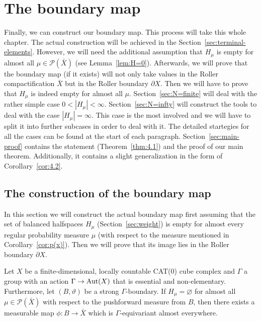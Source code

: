 \section{The boundary map}
\label{sec:map}

Finally, we can construct our boundary map. This process will take this whole chapter. The actual construction will be achieved in the Section~\ref{sec:terminal-elements}. However, we will need the additional assumption that \(H_\mu\) is empty for almost all \(\mu \in \mathcal{P}(\bar X)\) (see Lemma~\ref{lem:H=0}). Afterwards, we will prove that the boundary map (if it exists) will not only take values in the Roller compactification \(\bar X\) but in the Roller boundary \(\partial X\). Then we will have to prove that \(H_\mu\) is indeed empty for almost all \(\mu\). Section~\ref{sec:N=finite} will deal with the rather simple case \(0 < |H_\mu| < \infty\). Section~\ref{sec:N=infty} will construct the tools to deal with the case \(|H_\mu| = \infty\). This case is the most involved and we will have to split it into further subcases in order to deal with it. The detailed startegies for all the cases can be found at the start of each paragraph. Section~\ref{sec:main-proof} contains the statement (Theorem~\ref{thm:4.1}) and the proof of our main theorem. Additionally, it contains a slight generalization in the form of Corollary~\ref{cor:4.2}.

\subsection{The construction of the boundary map}
\label{sec:treminal-elements}
In this section we will construct the actual boundary map first assuming that the set of balanced halfspaces \(H_\mu\) (Section~\ref{sec:weight}) is empty for almost every regular probability measure \(\mu\) (with respect to the measure mentioned in Corollary~\ref{cor:p(x)}). Then we will prove that its image lies in the Roller boundary \(\partial X\).

\begin{lemma}
  \label{lem:H=0}
  Let \(X\) be a finite-dimensional, locally countable CAT(0) cube complex and \(\Gamma\) a group with an action \(\Gamma \to \operatorname{Aut}(X)\) that is essential and non-elementary. Furthermore, let \((B, \vartheta)\) be a strong \(\Gamma\)-boundary. If \(H_\mu = \varnothing\) for almost all \(\mu \in \mathcal{P}(\bar X)\) with respect to the pushforward measure from \(B\), then there exists a measurable map \(\phi\colon B \to \bar X\) which is \(\Gamma\)-equivariant almost everywhere.
\end{lemma}

